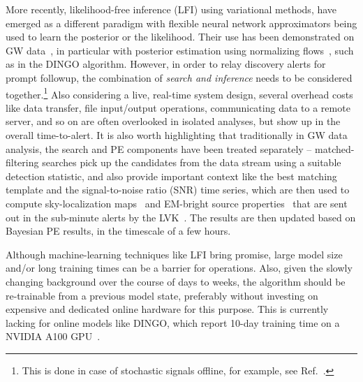 \begin{refsection}
More recently, likelihood-free inference (LFI) using variational methods, have emerged as a different paradigm with flexible neural network approximators being used to learn the posterior or the likelihood. 
Their use has been demonstrated on GW data~\cite{Gabbard_2021, PhysRevD.108.042004}, in particular with posterior estimation using normalizing flows~\cite{Dax_2021}, such as in the DINGO algorithm. 
However, in order to relay discovery alerts for prompt followup, the combination of \emph{search and inference} needs to be considered together.\footnote{This is done in case of stochastic signals offline, for example, see Ref.~\cite{Smith_2018}.}
Also considering a live, real-time system design, several overhead costs like data transfer, file input/output operations, communicating data to a remote server, and so on are often overlooked in isolated analyses, but show up in the overall time-to-alert.
It is also worth highlighting that traditionally in GW data analysis, the search and PE components have been treated separately -- matched-filtering searches pick up the candidates from the data stream using a suitable detection statistic, and also provide important context like the best matching template and the signal-to-noise ratio (SNR) time series, which are then used to compute sky-localization maps~\cite{Singer_2016} and EM-bright source properties~\cite{Chatterjee:2019avs} that are sent out in the sub-minute alerts by the LVK~\cite{Chaudhary_2024}.
The results are then updated based on Bayesian PE results, in the timescale of a few hours.

Although machine-learning techniques like LFI bring promise, large model size and/or long training times can be a barrier for operations.
Also, given the slowly changing background over the course of days to weeks, the algorithm should be re-trainable from a previous model state, preferably without investing on expensive and dedicated online hardware for this purpose. 
This is currently lacking for online models like DINGO, which report 10-day training time on a NVIDIA A100 GPU~\cite{Dax_2021}.


\end{refsection}
